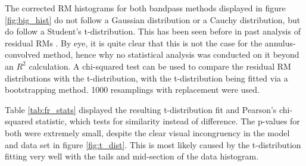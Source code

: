 The corrected RM histograms for both bandpass methods displayed in figure \ref{fig:big_hist} do not follow a Gaussian distribution or a Cauchy distribution, but do follow a Student's t-distribution. This has been seen before in past analysis of residual RMs \citep{ID73}. By eye, it is quite clear that this is not the case for the annulus-convolved method, hence why no statistical analysis was conducted on it beyond an $R^2$ calculation. A chi-squared test can be used to compare the residual RM distributions with the t-distribution, with the t-distribution being fitted via a bootstrapping method. 1000 resamplings with replacement were used.

Table \ref{tab:fr_stats} displayed the resulting t-distribution fit and Pearson's chi-squared statistic, which tests for similarity instead of difference. The p-values for both were extremely small, despite the clear visual incongruency in the model and data set in figure \ref{fig:t_dist}. This is most likely caused by the t-distribution fitting very well with the tails and mid-section of the data histogram.

